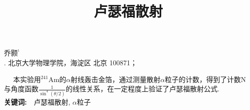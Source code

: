 \documentclass[a4paper,10.0pt,twoside]{npr}
\begin{document}
\setcounter{page}{001}%
\begin{center}
\title{%
\xiaoerhao \bf  %
卢瑟福散射\\[-5mm]}
\maketitle
\large \fs
乔颢$^{^1}$\\[2mm]

\xiaowu {}. 北京大学物理学院，海淀区 北京 100871；\\[4mm]

 

\parbox{158mm} {
~~\fs
本实验用$^{241}$Am的$\alpha$射线轰击金箔，通过测量散射$\alpha$粒子的计数，得到了计数N与角度函数$\frac{1}{\sin^4(\theta/2)}$的线性关系，在一定程度上验证了卢瑟福散射公式. \\

{\bf 关键词:}~~\fs 卢瑟福散射, $\alpha$粒子}\\
\end{center}
\vspace{5mm}
\setcounter{section}{0}
\end{document}
